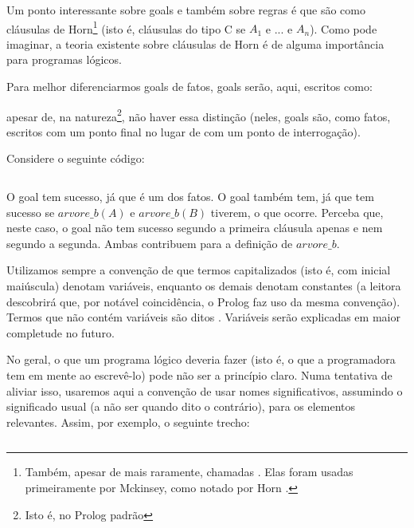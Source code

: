 \documentclass{article}
\begin{document}
Um ponto interessante sobre goals e também sobre regras é que são como cláusulas de Horn\footnote{Também, apesar de mais raramente, chamadas . Elas foram usadas primeiramente por Mckinsey, como notado por Horn \cite{horn}.} (isto é, cláusulas do tipo C se $A_1$ e ... e $A_n$). Como pode imaginar, a teoria existente sobre cláusulas de Horn é de
alguma importância para programas lógicos.

Para melhor diferenciarmos goals de fatos, goals serão, aqui, escritos como:

\noindent apesar de, na natureza\footnote{Isto é, no Prolog padrão}, não haver essa distinção (neles, goals são, como fatos,
escritos com um ponto final no lugar de com um ponto de interrogação).


Considere o seguinte código:\\

%
\inputminted{prolog}{../Exemplos/Cap0/prog3_arvb.pl}\label{lst:arvb}

O goal  tem sucesso, já que é um dos fatos. O goal  também tem, já que  tem sucesso se $arvore\_b(A)$ e $arvore\_b(B)$ tiverem, o que ocorre. Perceba que, neste caso, o goal não tem sucesso segundo a primeira cláusula apenas e nem segundo a segunda. Ambas contribuem para a definição de $arvore\_b$.

Utilizamos sempre a convenção de que termos capitalizados (isto é, com inicial maiúscula) denotam variáveis, enquanto os demais denotam constantes (a leitora descobrirá que, por notável coincidência, o Prolog faz uso da mesma convenção). Termos que não
contém variáveis são ditos . Variáveis serão explicadas em maior completude no futuro.

No geral, o que um programa lógico deveria fazer (isto é, o que a programadora tem em mente ao escrevê-lo) pode não ser a princípio claro. Numa tentativa de aliviar isso, usaremos aqui a convenção de usar nomes significativos, assumindo o significado usual (a não ser quando dito o contrário), para os elementos relevantes. Assim, por exemplo, o seguinte trecho:

\inputminted{prolog}{../Exemplos/Cap0/prog4_pai.pl}\label{lst:pai_filho}
\end{document}
